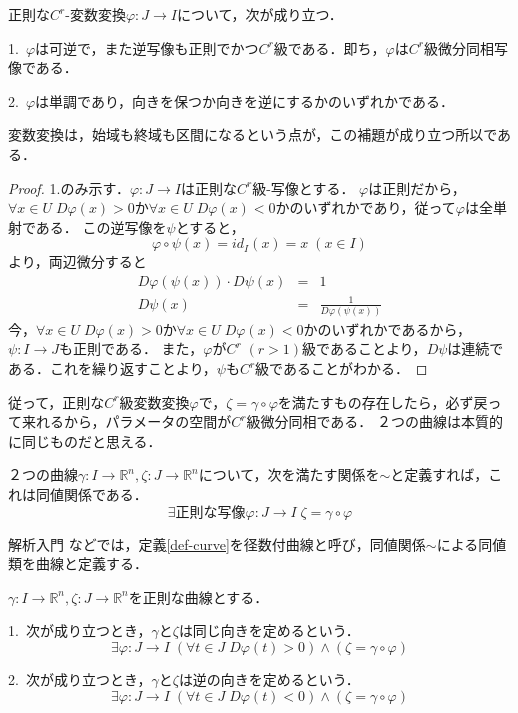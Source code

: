 \documentclass[uplatex, dvipdfmx]{jsreport}
\begin{document}
\begin{proposition}[正則な変数変換]\rm{}\label{prop-regularity-of-transformations-of-parameters}
    正則な$C^r$-変数変換$\varphi:J\to I$について，次が成り立つ．

    1.\, $\varphi$は可逆で，また逆写像も正則でかつ$C^r$級である．即ち，$\varphi$は$C^r$級微分同相写像である．

    2.\, $\varphi$は単調であり，向きを保つか向きを逆にするかのいずれかである．
\end{proposition}
変数変換は，始域も終域も区間になるという点が，この補題が成り立つ所以である．
\begin{proof}
    1.のみ示す．$\varphi:J\to I$は正則な$C^r$級-写像とする．
    $\varphi$は正則だから，$\forall x\in U\; D\varphi(x)>0$か$\forall x\in U\; D\varphi(x)<0$かのいずれかであり，従って$\varphi$は全単射である．
    この逆写像を$\psi$とすると，
    \[ \varphi\circ\psi(x)=id_I(x)=x\;(x\in I) \]
    より，両辺微分すると
    \begin{eqnarray*}
        D\varphi(\psi(x))\cdot D\psi(x)&=&1 \\
        D\psi(x)&=&\frac{1}{D\varphi(\psi(x))}
    \end{eqnarray*}
    今，$\forall x\in U\; D\varphi(x)>0$か$\forall x\in U\; D\varphi(x)<0$かのいずれかであるから，$\psi:I\to J$も正則である．
    また，$\varphi$が$C^r\;(r>1)$級であることより，$D\psi$は連続である．これを繰り返すことより，$\psi$も$C^r$級であることがわかる．
\end{proof}


従って，正則な$C^r$級変数変換$\varphi$で，$\zeta=\gamma\circ\varphi$を満たすもの存在したら，必ず戻って来れるから，パラメータの空間が$C^r$級微分同相である．
２つの曲線は本質的に同じものだと思える．
\begin{corollary}
    ２つの曲線$\gamma:I\to\mathbb{R}^n,\zeta:J\to\mathbb{R}^n$について，次を満たす関係を$\sim$と定義すれば，これは同値関係である．
    \[ \exists 正則な写像\varphi:J\to I　\; \zeta =\gamma\circ\varphi \]
\end{corollary}
\begin{remark}
    解析入門 \cite{解析入門}などでは，定義\ref{def-curve}を径数付曲線と呼び，同値関係$\sim$による同値類を曲線と定義する．
\end{remark}

\begin{definition}[正則曲線同士の向き]\label{def-orientation-of-regular-curve}
    $\gamma:I\to\mathbb{R}^n, \zeta:J\to\mathbb{R}^n$を正則な曲線とする．

    1.\, 次が成り立つとき，$\gamma$と$\zeta$は同じ向きを定めるという．
    \[ \exists \varphi:J\to I\; (\forall t\in J\; D\varphi(t)>0) \land (\zeta=\gamma\circ\varphi) \]

    2.\, 次が成り立つとき，$\gamma$と$\zeta$は逆の向きを定めるという．
    \[ \exists \varphi:J\to I\; (\forall t\in J\; D\varphi(t)<0) \land (\zeta=\gamma\circ\varphi) \]
\end{definition}
\end{document}
